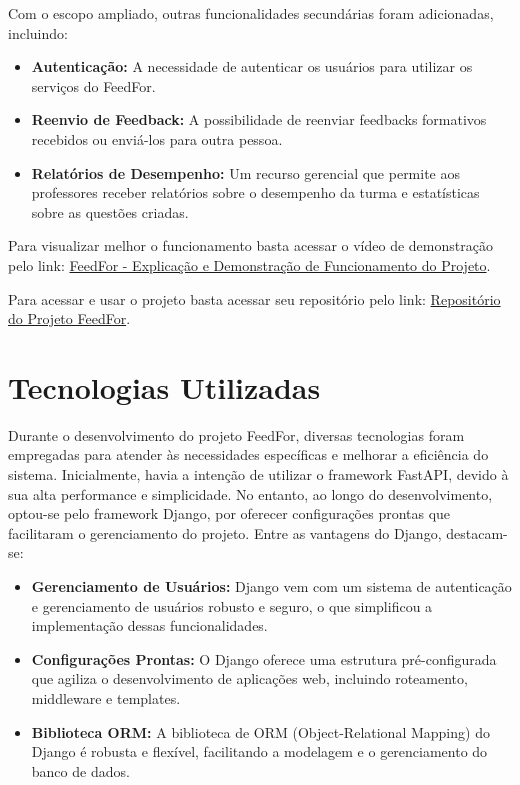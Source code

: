 Com o escopo ampliado, outras funcionalidades secundárias foram adicionadas, incluindo:

\begin{itemize}
    \item \textbf{Autenticação:} A necessidade de autenticar os usuários para utilizar os serviços do FeedFor.
    \item \textbf{Reenvio de Feedback:} A possibilidade de reenviar feedbacks formativos recebidos ou enviá-los para outra pessoa.
    \item \textbf{Relatórios de Desempenho:} Um recurso gerencial que permite aos professores receber relatórios sobre o desempenho da turma e estatísticas sobre as questões criadas.
\end{itemize}

Para visualizar melhor o funcionamento basta acessar o vídeo de demonstração pelo link: \href{https://youtu.be/KL6FrNapAPk}{FeedFor - Explicação e Demonstração de Funcionamento do Projeto}.

Para acessar e usar o projeto basta acessar seu repositório pelo link: \href{https://github.com/oCaioOliveira/FeedFor}{Repositório do Projeto FeedFor}.

\section{Tecnologias Utilizadas}

Durante o desenvolvimento do projeto FeedFor, diversas tecnologias foram empregadas para atender às necessidades específicas e melhorar a eficiência do sistema. Inicialmente, havia a intenção de utilizar o framework FastAPI, devido à sua alta performance e simplicidade. No entanto, ao longo do desenvolvimento, optou-se pelo framework Django, por oferecer configurações prontas que facilitaram o gerenciamento do projeto. Entre as vantagens do Django, destacam-se:

\begin{itemize}
    \item \textbf{Gerenciamento de Usuários:} Django vem com um sistema de autenticação e gerenciamento de usuários robusto e seguro, o que simplificou a implementação dessas funcionalidades.
    \item \textbf{Configurações Prontas:} O Django oferece uma estrutura pré-configurada que agiliza o desenvolvimento de aplicações web, incluindo roteamento, middleware e templates.
    \item \textbf{Biblioteca ORM:} A biblioteca de ORM (Object-Relational Mapping) do Django é robusta e flexível, facilitando a modelagem e o gerenciamento do banco de dados.
\end{itemize}

